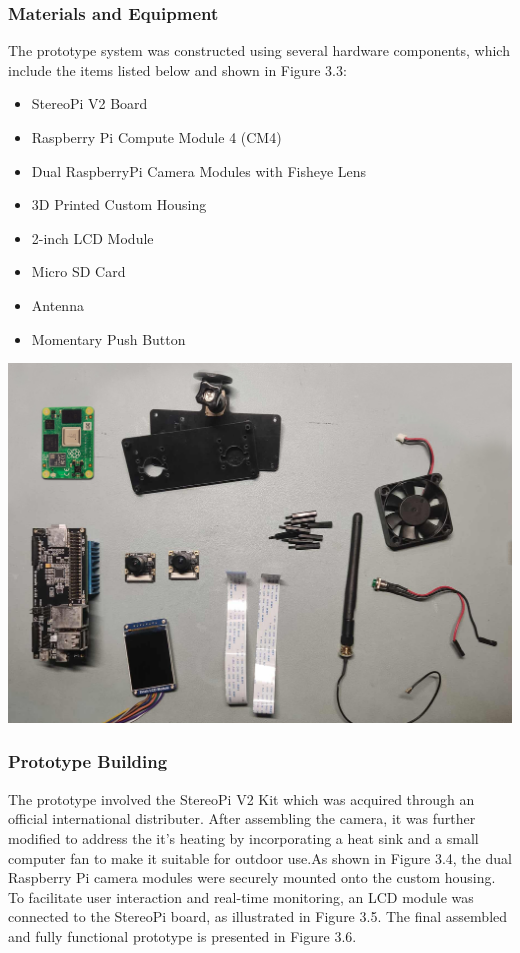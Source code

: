 \subsubsection{Materials and Equipment}


The prototype system was constructed using several hardware components, which include the items listed below and shown in Figure 3.3:
\begin{itemize}
	\item StereoPi V2 Board
	\item Raspberry Pi Compute Module 4 (CM4)
	\item Dual RaspberryPi Camera Modules with Fisheye Lens
	\item 3D Printed Custom Housing
	\item 2-inch LCD Module
	\item Micro SD Card
	\item Antenna
	\item Momentary Push Button
\end{itemize}

\begin{center}
	\includegraphics[width=\textwidth]{Parts.png}
\end{center}



\subsubsection{Prototype Building}
The prototype involved the StereoPi V2 Kit which was acquired through an official international distributer. After assembling the camera, it was further modified to address the it's heating by incorporating a heat sink and a small computer fan to make it suitable for outdoor use.As shown in Figure 3.4, the dual Raspberry Pi camera modules were securely mounted onto the custom housing. To facilitate user interaction and real-time monitoring, an LCD module was connected to the StereoPi board, as illustrated in Figure 3.5. The final assembled and fully functional prototype is presented in Figure 3.6.


